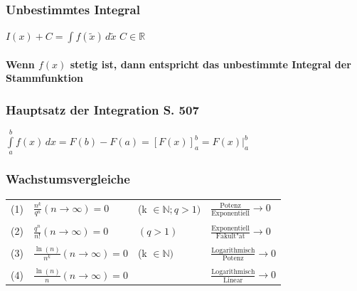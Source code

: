		
		\subsubsection{Unbestimmtes Integral}
			$I(x) + C = \int \limits f(\tilde{x}) \, d\tilde{x} $ \quad  $C \in \mathbb{R}$ \\
			\\
			\textbf{Wenn $f(x)$ stetig ist, dann entspricht das unbestimmte Integral der Stammfunktion}
		
		
		\subsubsection{Hauptsatz der Integration S. 507}
		$\int \limits_a^b f(x) \, dx = F(b) - F(a) = \left[ F(x) \right]_a^b = F(x) \vert_a^b $
			
	
	
	\subsubsection{Wachstumsvergleiche}			 
			\begin{tabular}{llll}
			(1) & $\frac{n^k}{q^n} (n \rightarrow \infty)= 0$  & (k $\in \mathbb{N}; q > 1)$ & $\frac{\text{Potenz}}{\text{Exponentiell}} \rightarrow 0$\\
			\\
			(2) & $\frac{q^n}{n!} (n \rightarrow \infty)= 0$ & $(q > 1)$ & $\frac{\text{Exponentiell}}{\text{Fakult"at}} \rightarrow 0$ \\
			\\
			(3) & $\frac{\ln(n)}{n^k} (n \rightarrow \infty)= 0$ & (k $\in \mathbb{N})$ & $\frac{\text{Logarithmisch}}{\text{Potenz}} \rightarrow 0$ \\
			\\
			(4) & $\frac{\ln(n)}{n} (n \rightarrow \infty)= 0$ & & $\frac{\text{Logarithmisch}}{\text{Linear}} \rightarrow 0$ \\
			\end{tabular}